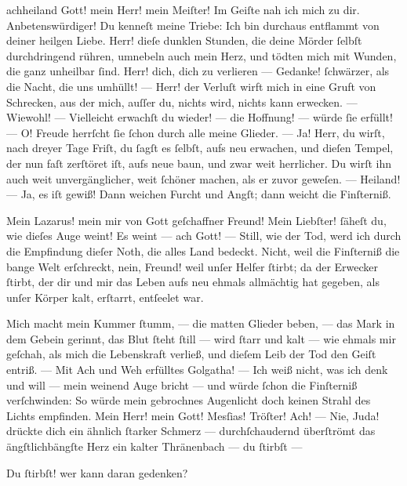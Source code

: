 \documentclass{ees}
\begin{document}
{\begin{movement}{achheiland}
    \voice[Johannes]
    \hspace*{3cm}Gott! mein Herr! mein Meiſter!
    Im Geiſte nah ich mich zu dir.
    Anbetenswürdiger! Du kenneſt meine Triebe:
    Ich bin durchaus entflammt von deiner heilgen Liebe.
    Herr! dieſe dunklen Stunden,
    die deine Mörder ſelbſt durchdringend rühren,
    umnebeln auch mein Herz, und tödten mich mit Wunden,
    die ganz unheilbar ſind. Herr! dich, dich zu verlieren —
    Gedanke! ſchwärzer, als die Nacht, die uns umhüllt! —
    Herr! der Verluſt wirft mich in eine Gruft von Schrecken,
    aus der mich, auſſer du, nichts wird, nichts kann erwecken. —
    Wiewohl! — Vielleicht erwachſt du wieder! —
    die Hoffnung! — würde ſie erfüllt! —
    O! Freude herrſcht ſie ſchon durch alle meine Glieder. —
    Ja! Herr, du wirſt, nach dreyer Tage Friſt,
    du ſagſt es ſelbſt, aufs neu erwachen,
    und dieſen Tempel, der nun faſt zerſtöret iſt,
    aufs neue baun, und zwar weit herrlicher.
    Du wirſt ihn auch weit unvergänglicher,
    weit ſchöner machen,
    als er zuvor geweſen. — Heiland! — Ja, es iſt gewiß!
    Dann weichen Furcht und Angſt; dann weicht die Finſterniß.

    \voice[Eidli]
    Mein Lazarus! mein mir von Gott geſchaffner Freund!
    Mein Liebſter! ſäheſt du, wie dieſes Auge weint!
    Es weint — ach Gott! — Still, wie der Tod,
    werd ich durch die Empfindung dieſer Noth,
    die alles Land bedeckt.
    Nicht, weil die Finſterniß die bange Welt erſchreckt,
    nein, Freund! weil unſer Helfer ſtirbt;
    da der Erwecker ſtirbt, der dir und mir das Leben
    aufs neu ehmals allmächtig hat gegeben,
    als unſer Körper kalt, erſtarrt, entſeelet war.

    \voice[Lazarus]
    Mich macht mein Kummer ſtumm, — die matten Glieder beben, —
    das Mark in dem Gebein gerinnt, das Blut ſteht ſtill —
    wird ſtarr und kalt — wie ehmals mir geſchah,
    als mich die Lebenskraft verließ,
    und dieſem Leib der Tod den Geiſt entriß. —
    Mit Ach und Weh erfülltes Golgatha! —
    Ich weiß nicht, was ich denk und will —
    mein weinend Auge bricht —
    und würde ſchon die Finſterniß verſchwinden:
    So würde mein gebrochnes Augenlicht
    doch keinen Strahl des Lichts empfinden.
    Mein Herr! mein Gott! Mesſias! Tröſter! Ach! —
    Nie, Juda! drückte dich ein ähnlich ſtarker Schmerz —
    durchſchaudernd überſtrömt das ängſtlichbängſte Herz
    ein kalter Thränenbach —
    du ſtirbſt —

    \voice[Eidli]
    \hspace*{3cm}Du ſtirbſt! wer kann daran gedenken?


\end{movement}}
\end{document}
